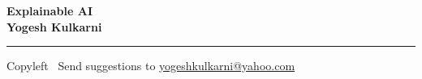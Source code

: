 
\graphicspath{{images/}}

\footnotesize


\begin{center}
\Large{\textbf{Explainable AI\\ Yogesh Kulkarni}}  
\end{center}

\begin{multicols}{2}
% 

\end{multicols}

\rule{\linewidth}{0.25pt}
\scriptsize
Copyleft \textcopyleft\  Send suggestions to 
\href{http://yati.io}{yogeshkulkarni@yahoo.com}


